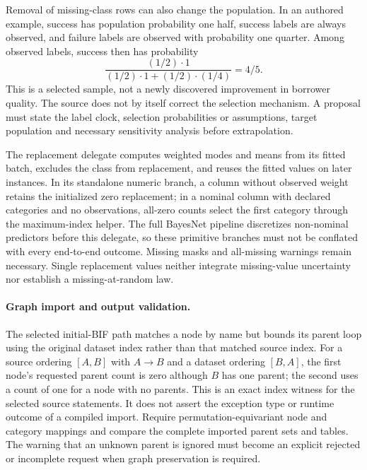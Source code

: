 Removal of missing-class rows can also change the population. In an authored
example, success has population probability one half, success labels are always
observed, and failure labels are observed with probability one quarter. Among
observed labels, success then has probability
\[
 \frac{(1/2)\cdot1}{(1/2)\cdot1+(1/2)\cdot(1/4)}=4/5.
\]
This is a selected sample, not a newly discovered improvement in borrower
quality. The source does not by itself correct the selection mechanism. A
proposal must state the label clock, selection probabilities or assumptions,
target population and necessary sensitivity analysis before extrapolation.
\citep{exec24_weka_choice}

The replacement delegate computes weighted modes and means from its fitted
batch, excludes the class from replacement, and reuses the fitted values on
later instances. In its standalone numeric branch, a column without observed
weight retains the initialized zero replacement; in a nominal column with
declared categories and no observations, all-zero counts select the first
category through the maximum-index helper. The full BayesNet pipeline
discretizes non-nominal predictors before this delegate, so these primitive
branches must not be conflated with every end-to-end outcome. Missing masks
and all-missing warnings remain necessary. Single replacement values neither
integrate missing-value uncertainty nor establish a missing-at-random law.
\citep{exec24_weka_source}

\paragraph{Graph import and output validation.}
The selected initial-BIF path matches a node by name but bounds its parent loop
using the original dataset index rather than that matched source index. For a
source ordering $[A,B]$ with $A\to B$ and a dataset ordering $[B,A]$, the first
node's requested parent count is zero although $B$ has one parent; the second
uses a count of one for a node with no parents. This is an exact index witness
for the selected source statements. It does not assert the exception type or
runtime outcome of a compiled import. Require permutation-equivariant node and
category mappings and compare the complete imported parent sets and tables.
The warning that an unknown parent is ignored must become an explicit rejected
or incomplete request when graph preservation is required.
\citep{exec24_weka_source,exec24_weka_choice}

